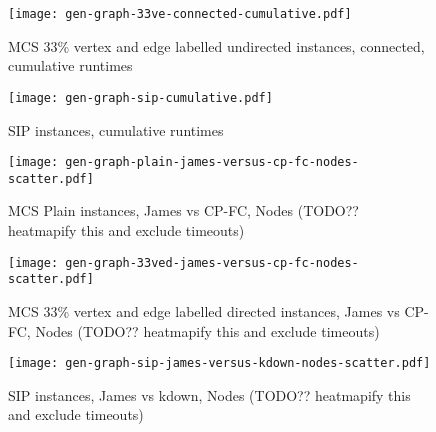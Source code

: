 \documentclass[letterpaper]{article}
\begin{document}
\begin{figure}
    \centering
    \texttt{[image: gen-graph-33ve-connected-cumulative.pdf]}
    \caption{MCS 33\% vertex and edge labelled undirected instances, connected, cumulative runtimes}\label{figure:33ve-connected-cumulative}
\end{figure}

\begin{figure}
    \centering
    \texttt{[image: gen-graph-sip-cumulative.pdf]}
    \caption{SIP instances, cumulative runtimes}\label{figure:sip-cumulative}
\end{figure}

\begin{figure}
    \centering
    \texttt{[image: gen-graph-plain-james-versus-cp-fc-nodes-scatter.pdf]}
    \caption{MCS Plain instances, James vs CP-FC, Nodes (TODO?? heatmapify this
    and exclude timeouts)}\label{figure:plain-james-versus-cp-fc-nodes-scatter}
\end{figure}

\begin{figure}
    \centering
    \texttt{[image: gen-graph-33ved-james-versus-cp-fc-nodes-scatter.pdf]}
    \caption{MCS 33\% vertex and edge labelled directed instances, James vs
    CP-FC, Nodes (TODO?? heatmapify this and exclude
    timeouts)}\label{figure:33ved-james-versus-cp-fc-nodes-scatter}
\end{figure}

\begin{figure}
    \centering
    \texttt{[image: gen-graph-sip-james-versus-kdown-nodes-scatter.pdf]}
    \caption{SIP instances, James vs kdown, Nodes (TODO?? heatmapify this and exclude
    timeouts)}\label{figure:sip-james-versus-kdown-nodes-scatter}
\end{figure}



\end{document}
